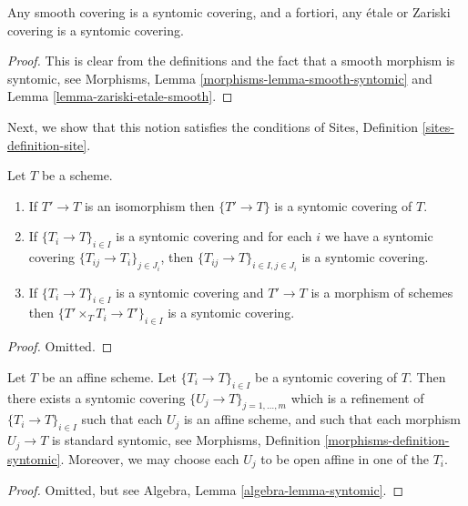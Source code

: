 \begin{lemma}
\label{lemma-zariski-etale-smooth-syntomic}
Any smooth covering is a syntomic covering, and a fortiori,
any \'etale or Zariski covering is a syntomic covering.
\end{lemma}

\begin{proof}
This is clear from the definitions and the fact that a smooth
morphism is syntomic, see
Morphisms, Lemma \ref{morphisms-lemma-smooth-syntomic}
and Lemma \ref{lemma-zariski-etale-smooth}.
\end{proof}

\noindent
Next, we show that this notion satisfies the conditions of
Sites, Definition \ref{sites-definition-site}.

\begin{lemma}
\label{lemma-syntomic}
Let $T$ be a scheme.
\begin{enumerate}
\item If $T' \to T$ is an isomorphism then $\{T' \to T\}$
is a syntomic covering of $T$.
\item If $\{T_i \to T\}_{i\in I}$ is a syntomic covering and for each
$i$ we have a syntomic covering $\{T_{ij} \to T_i\}_{j\in J_i}$, then
$\{T_{ij} \to T\}_{i \in I, j\in J_i}$ is a syntomic covering.
\item If $\{T_i \to T\}_{i\in I}$ is a syntomic covering
and $T' \to T$ is a morphism of schemes then
$\{T' \times_T T_i \to T'\}_{i\in I}$ is a syntomic covering.
\end{enumerate}
\end{lemma}

\begin{proof}
Omitted.
\end{proof}

\begin{lemma}
\label{lemma-syntomic-affine}
Let $T$ be an affine scheme.
Let $\{T_i \to T\}_{i \in I}$ be a syntomic covering of $T$.
Then there exists a syntomic covering
$\{U_j \to T\}_{j = 1, \ldots, m}$ which is a refinement
of $\{T_i \to T\}_{i \in I}$ such that each $U_j$ is an affine
scheme, and such that each morphism $U_j \to T$ is standard
syntomic, see Morphisms, Definition \ref{morphisms-definition-syntomic}.
Moreover, we may choose each $U_j$ to be open affine in one of the $T_i$.
\end{lemma}

\begin{proof}
Omitted, but see Algebra, Lemma \ref{algebra-lemma-syntomic}.
\end{proof}

